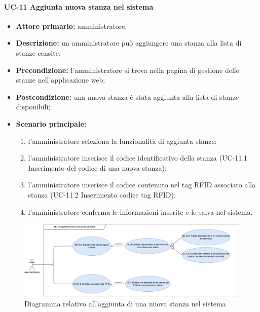 \paragraph{UC-11 Aggiunta nuova stanza nel sistema}
\begin{itemize}
    \item \textbf{Attore primario:} amministratore;
    \item \textbf{Descrizione:} un amministratore pu\`{o} aggiungere una stanza alla lista di stanze censite;
    \item \textbf{Precondizione:} l'amministratore si trova nella pagina di gestione delle stanze nell'applicazione web;
    \item \textbf{Postcondizione:} una nuova stanza \`{e} stata aggiunta alla lista di stanze disponibili;
    \item \textbf{Scenario principale:}
    \begin{enumerate}
        \item l'amministratore seleziona la funzionalità di aggiunta stanze;
        \item l'amministratore inserisce il codice identificativo della stanza (UC-11.1 Inserimento del codice di una nuova stanza);
        \item l'amministratore inserisce il codice contenuto nel tag RFID associato alla stanza (UC-11.2 Inserimento codice tag RFID);
        \item l'amministratore conferma le informazioni inserite e le salva nel sistema.
    \end{enumerate}
\end{itemize}

\begin{figure}[H]
    \centering
      \includegraphics[scale=0.35]{src/CasiDUso/immagini/AggiuntaNuovaStanza.png}
    \caption{Diagramma relativo all'aggiunta di una nuova stanza nel sistema}
\end{figure}


